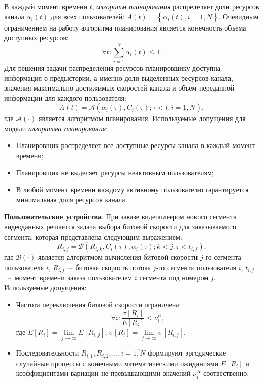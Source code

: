 В каждый момент времени $t$, \textit{алгоритм планирования} распределяет доли ресурсов канала $\alpha_i(t)$ для всех пользователей:  $\overline{A}(t) = \left\{\alpha_{i}(t), i = \overline{1,N}\right\}$. Очевидным ограничением на работу алгоритма планирования является конечность объема доступных ресурсов:
$$\forall t: \sum\limits_{i=1}^{N}\alpha_{i}(t) \leq 1.$$
Для решения задачи распределения ресурсов планировщику доступна информация о предыстории, а именно доли выделенных ресурсов канала, значения максимально достижимых скоростей канала и объем переданной информации для каждого пользователя:
\begin{equation}
\nonumber
A(t) = \mathcal{A}\left( \alpha_i(\tau), C_i(\tau);\tau<t, i=\overline{1,N} \right),
\label{eq:SchedulingRule}
\end{equation}
где $\mathcal{A}\left(\cdot\right)$ является алгоритмом планирования.
\newline
Используемые допущения для модели \textit{алгоритма планирования}:
\begin{itemize}
	\item Планировщик распределяет все доступные ресурсы канала в каждый момент времени;
	\item Планировщик не выделяет ресурсы неактивным пользователям;
	\item В любой момент времени каждому активному пользователю гарантируется минимальная доля ресурсов канала.
\end{itemize}	

\textbf{Пользовательские устройства}. При заказе видеоплеером нового сегмента видеоданных решается задача выбора битовой скорости для заказываемого сегмента, которая представлена следующим выражением:
\begin{equation}
\nonumber
R_{i,j} = \mathcal{B}\left(R_{i,k}, C_i(\tau), \alpha_i(\tau); k < j, \tau<t_{i,j} \right),
\end{equation}
где $\mathcal{B}\left(\cdot\right)$ является алгоритмом вычисления битовой скорости $j$-го сегмента пользователя $i$, $R_{i,j}$~--~битовая скорость потока $j$-го сегмента пользователя $i$, $t_{i,j}$~--~момент времени заказа пользователем $i$ сегмента под номером $j$.
\newline
Используемые допущения:
\begin{itemize}
	\item Частота переключения битовой скорости ограничена:
	\begin{equation}
	\nonumber
	\forall i: \frac{ \sigma\left[R_{i}\right] }{ E\left[R_{i}\right]} \leq \nu^R_i,
	\label{eq:SwitchRatio}
	\end{equation}
	где $E[R_i] = \lim\limits_{j \rightarrow \infty}E[R_{i,j}]$, $\sigma\left[R_{i}\right] = \lim\limits_{j \rightarrow \infty}\sigma\left[R_{i,j}\right]$.
	\item Последовательности $R_{i,1}, R_{i,2}, \ldots, i=\overline{1,N}$ формируют эргодические случайные процессы с конечными математическими ожиданиями $E[R_{i}]$ и коэффициентами вариации не превышающими значений $\nu^R_i$ соотвественно.
\end{itemize}

